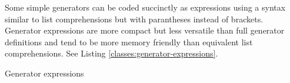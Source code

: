 Some simple generators can be coded succinctly as expressions
using a syntax similar to list comprehensions
but with parantheses instead of brackets.
Generator expressions are more compact but less versatile
than full generator definitions
and tend to be more memory friendly than equivalent list comprehensions.
See Listing \ref{classes:generator-expressions}.

\begin{program}
\caption{Generator expressions\label{classes:generator-expressions}}
\end{program}
